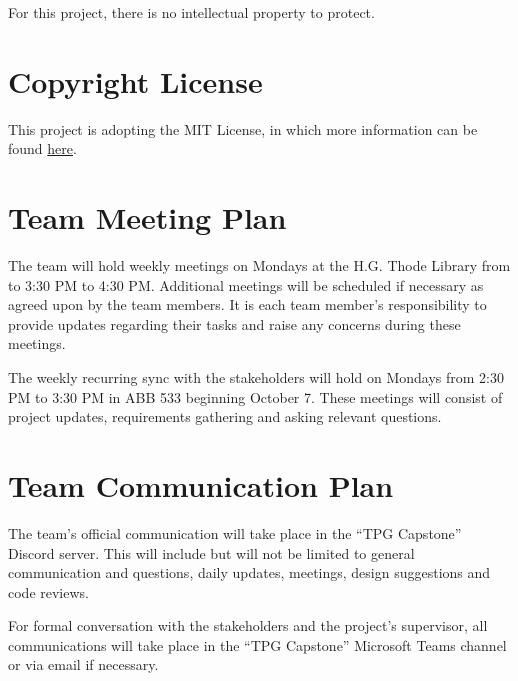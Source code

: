 \documentclass{article}
\begin{document}
For this project, there is no intellectual property to protect.

\section{Copyright License}
This project is adopting the MIT License, in which more information can be found \href{https://github.com/TPGEngine/tpg/blob/main/LICENSE}{here}.

\section{Team Meeting Plan}
The team will hold weekly meetings on Mondays at the H.G. Thode Library from to 3:30 PM to 4:30 PM. Additional meetings will be scheduled if necessary as agreed upon by the team members. It is each team member’s responsibility to provide updates regarding their tasks and raise any concerns during these meetings. 

\vspace*{10pt}

\noindent The weekly recurring sync with the stakeholders will hold on Mondays from 2:30 PM to 3:30 PM in ABB 533 beginning October 7. These meetings will consist of project updates, requirements gathering and asking relevant questions.

\section{Team Communication Plan}
The team’s official communication will take place in the “TPG Capstone” Discord server. This will include but will not be limited to general communication and questions, daily updates, meetings, design suggestions and code reviews.

\vspace*{10pt}

\noindent For formal conversation with the stakeholders and the project’s supervisor, all communications will take place in the “TPG Capstone” Microsoft Teams channel or via email if necessary.
\end{document}
